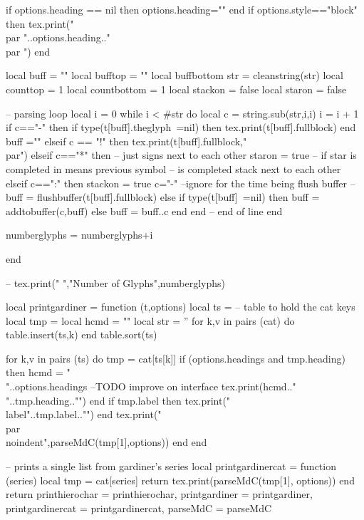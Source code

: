   if options.heading == nil then options.heading="" end
  if options.style=="block" then
     tex.print("\\par "..options.heading.."\\par ")
  end

  local buff = ""
  local bufftop = ""
  local buffbottom
  str = cleanstring(str)
  local counttop = 1
  local countbottom = 1
  local stackon = false
  local staron = false

-- parsing loop
  local i = 0
  while i < #str do
    local c = string.sub(str,i,i)
    i = i + 1
    if c=="-" then
       if type(t[buff].theglyph~=nil) then
         tex.print(t[buff].fullblock)
       end
       buff =""
     elseif c == "!" then
       tex.print(t[buff].fullblock,"\\par")
     elseif c=="*" then -- just signs next to each other
       staron = true
       -- if star is completed in means previous symbol
       -- is completed stack next to each other
     elseif c==":" then
         stackon = true
         c="-" --ignore for the time being flush buffer
   --buff = flushbuffer(t[buff].fullblock)
     else
       if type(t[buff]~=nil) then
            buff = addtobuffer(c,buff)
       else
            buff = buff..c
       end
  end
    -- end of line
  end

  numberglyphs = numberglyphs+i

end

-- tex.print(" ","Number of Glyphs",numberglyphs)

local printgardiner = function (t,options)
   local ts = {} -- table to hold the cat keys
   local tmp = {}
   local hcmd = ""
   local str = ''
   for k,v in pairs (cat) do
      table.insert(ts,k)
   end
   table.sort(ts)

   for k,v in pairs (ts) do
      tmp = cat[ts[k]]
      if (options.headings and tmp.heading) then
          hcmd = "\\"..options.headings --TODO improve on interface
          tex.print(hcmd.." {"..tmp.heading.."}")
      end
      if tmp.label then tex.print("\\label{"..tmp.label.."}") end
      tex.print("\\par\\noindent",parseMdC(tmp[1],options))
   end
end

-- prints a single list from gardiner's series
local printgardinercat = function (series)
      local tmp = cat[series]
      return tex.print(parseMdC(tmp[1], options))
end
return {printhierochar = printhierochar,
        printgardiner  = printgardiner,
        printgardinercat   = printgardinercat,
        parseMdC = parseMdC}


